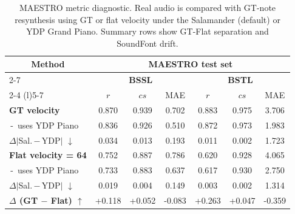 \begin{table}[!ht]
\caption{MAESTRO metric diagnostic. Real audio is compared with GT-note resynthesis using GT or flat velocity under the Salamander (default) or YDP Grand Piano. Summary rows show GT-Flat separation and SoundFont drift.}
\label{tab:bp_metric_diagnostic}
\centering
\fontsize{11pt}{13pt}\selectfont
\setlength{\tabcolsep}{11pt}
\renewcommand{\arraystretch}{1.2}
\begin{tabular}{l||ccc|ccc}
\toprule
\multicolumn{1}{c||}{\multirow{3}{*}{\textbf{Method}}}
& \multicolumn{6}{c}{\textbf{MAESTRO test set}} \\
\cmidrule(l){2-7}
& \multicolumn{3}{c|}{\textbf{BSSL}} & \multicolumn{3}{c}{\textbf{BSTL}} \\
\cmidrule(lr){2-4} \cmidrule(l){5-7}
& $r$ & $cs$ & MAE & $r$ & $cs$ & MAE \\
\midrule
\textbf{GT velocity}            & 0.870 & 0.939 & 0.702 & 0.883 & 0.975 & 3.706 \\
\,-\, uses YDP Piano            & 0.836 & 0.926 & 0.510 & 0.872 & 0.973 & 1.983 \\
$\Delta\lvert$Sal.\,$-$\,YDP$\rvert$ $\downarrow$
                                & 0.034 & 0.013 & 0.193
                                & 0.011 & 0.002 & 1.723 \\
\midrule
\textbf{Flat velocity = 64}     & 0.752 & 0.887 & 0.786 & 0.620 & 0.928 & 4.065 \\
\,-\, uses YDP Piano            & 0.733 & 0.883 & 0.637 & 0.617 & 0.930 & 2.750 \\
$\Delta\lvert$Sal.\,$-$\,YDP$\rvert$ $\downarrow$
                                & 0.019 & 0.004 & 0.149
                                & 0.003 & 0.002 & 1.314 \\
\midrule
\textbf{$\Delta$ (GT $-$ Flat) $\uparrow$}
                                & +0.118 & +0.052 & -0.083
                                & +0.263 & +0.047 & -0.359 \\
\bottomrule
\end{tabular}
\end{table}
